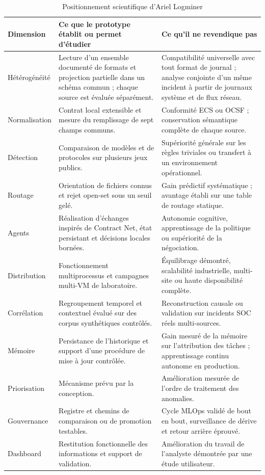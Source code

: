 \begin{table}[H]
\centering
\caption{Positionnement scientifique d'Ariel Logminer}
\label{tab:positionnement-logminer}
\small
\begin{tabularx}{\textwidth}{p{3.15cm}X X}
\toprule
\textbf{Dimension} &
\textbf{Ce que le prototype établit ou permet d'étudier} &
\textbf{Ce qu'il ne revendique pas} \\
\midrule
Hétérogénéité &
Lecture d'un ensemble documenté de formats et projection partielle dans un schéma commun ; chaque source est évaluée séparément. &
Compatibilité universelle avec tout format de journal ; analyse conjointe d'un même incident à partir de journaux système et de flux réseau. \\
Normalisation &
Contrat local extensible et mesure du remplissage de sept champs communs. &
Conformité ECS ou OCSF ; conservation sémantique complète de chaque source. \\
Détection &
Comparaison de modèles et de protocoles sur plusieurs jeux publics. &
Supériorité générale sur les règles triviales ou transfert à un environnement opérationnel. \\
Routage &
Orientation de fichiers connus et rejet open-set sous un seuil gelé. &
Gain prédictif systématique ; avantage établi sur une table de routage statique. \\
Agents &
Réalisation d'échanges inspirés de Contract Net, état persistant et décisions locales bornées. &
Autonomie cognitive, apprentissage de la politique ou supériorité de la négociation. \\
Distribution &
Fonctionnement multiprocessus et campagnes multi-VM de laboratoire. &
Équilibrage démontré, scalabilité industrielle, multi-site ou haute disponibilité complète. \\
Corrélation &
Regroupement temporel et contextuel évalué sur des corpus synthétiques contrôlés. &
Reconstruction causale ou validation sur incidents SOC réels multi-sources. \\
Mémoire &
Persistance de l'historique et support d'une procédure de mise à jour contrôlée. &
Gain mesuré de la mémoire sur l'attribution des tâches ; apprentissage continu autonome en production. \\
Priorisation &
Mécanisme prévu par la conception. &
Amélioration mesurée de l'ordre de traitement des anomalies. \\
Gouvernance &
Registre et chemins de comparaison ou de promotion testables. &
Cycle MLOps validé de bout en bout, surveillance de dérive et retour arrière éprouvé. \\
Dashboard &
Restitution fonctionnelle des informations et support de validation. &
Amélioration du travail de l'analyste démontrée par une étude utilisateur. \\
\bottomrule
\end{tabularx}
\end{table}


